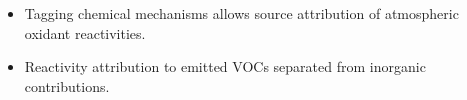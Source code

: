 \begin{BlueBox}
    \vskip-1cm
    \begin{block}{}
        \begin{itemize}
            \item Tagging chemical mechanisms allows source attribution of atmospheric oxidant reactivities. \vspace{9mm}
            \item Reactivity attribution to emitted VOCs separated from inorganic contributions.  \vspace{5mm} 
        \end{itemize}        
    \end{block}
\end{BlueBox}
